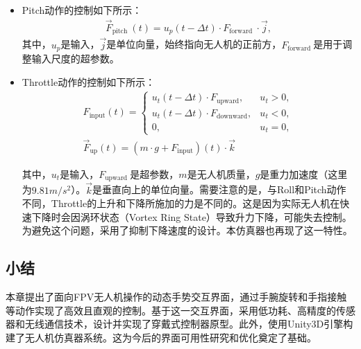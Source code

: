\begin{itemize}
    \item Pitch动作的控制如下所示：
          \begin{equation}
              \begin{gathered}
                  \vec{F}_{\text {pitch }}(t)=u_p(t-\Delta t) \cdot F_{\text {forward }} \cdot \vec{j},
              \end{gathered}
          \end{equation}
          其中，$u_p$是输入，$\Vec{j}$是单位向量，始终指向无人机的正前方，$F_{\text {forward }}$是用于调整输入尺度的超参数。
\end{itemize}

\begin{itemize}
    \item Throttle动作的控制如下所示：
          \begin{equation}
              \begin{aligned}
                  F_{\text{input}}(t) =
                  \begin{cases}
                      u_t(t-\Delta t) \cdot F_{\text{upward}},   & u_t > 0, \\
                      u_t(t-\Delta t) \cdot F_{\text{downward}}, & u_t < 0, \\
                      0,                                         & u_t = 0,
                  \end{cases} \\
                  \Vec{F}_{\text{up}}(t) = (m \cdot g + F_{\text{input}})(t) \cdot \Vec{k}
              \end{aligned}
          \end{equation}

          其中，$u_t$是输入，$F_{\text {upward }}$是超参数，$m$是无人机质量，$g$是重力加速度（这里为$9.81 m/s^2$）。$\Vec{k}$是垂直向上的单位向量。需要注意的是，与Roll和Pitch动作不同，Throttle的上升和下降所施加的力是不同的。这是因为实际无人机在快速下降时会因涡环状态（Vortex Ring State）导致升力下降，可能失去控制。为避免这个问题，采用了抑制下降速度的设计。本仿真器也再现了这一特性。

\end{itemize}

\subsection{小结}
本章提出了面向FPV无人机操作的动态手势交互界面，通过手腕旋转和手指接触等动作实现了高效且直观的控制。基于这一交互界面，采用低功耗、高精度的传感器和无线通信技术，设计并实现了穿戴式控制器原型。此外，使用Unity3D引擎构建了无人机仿真器系统。这为今后的界面可用性研究和优化奠定了基础。
\clearpage
\ifx\allfiles\undefined

\fi

